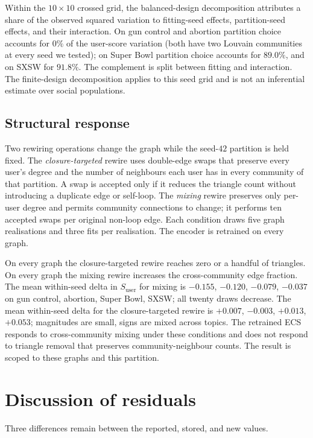 Within the $10\times 10$ crossed grid, the balanced-design decomposition attributes a share of the observed squared variation to fitting-seed effects, partition-seed effects, and their interaction. On gun control and abortion partition choice accounts for $0\%$ of the user-score variation (both have two Louvain communities at every seed we tested); on Super Bowl partition choice accounts for $89.0\%$, and on SXSW for $91.8\%$. The complement is split between fitting and interaction. The finite-design decomposition applies to this seed grid and is not an inferential estimate over social populations.

\subsection{Structural response}
\label{sec:structural}

Two rewiring operations change the graph while the seed-$42$ partition is held fixed. The \emph{closure-targeted} rewire uses double-edge swaps that preserve every user's degree and the number of neighbours each user has in every community of that partition. A swap is accepted only if it reduces the triangle count without introducing a duplicate edge or self-loop. The \emph{mixing} rewire preserves only per-user degree and permits community connections to change; it performs ten accepted swaps per original non-loop edge. Each condition draws five graph realisations and three fits per realisation. The encoder is retrained on every graph.

On every graph the closure-targeted rewire reaches zero or a handful of triangles. On every graph the mixing rewire increases the cross-community edge fraction. The mean within-seed delta in $S_{\mathrm{user}}$ for mixing is $-0.155$, $-0.120$, $-0.079$, $-0.037$ on gun control, abortion, Super Bowl, SXSW; all twenty draws decrease. The mean within-seed delta for the closure-targeted rewire is $+0.007$, $-0.003$, $+0.013$, $+0.053$; magnitudes are small, signs are mixed across topics. The retrained ECS responds to cross-community mixing under these conditions and does not respond to triangle removal that preserves community-neighbour counts. The result is scoped to these graphs and this partition.

\section{Discussion of residuals}
\label{sec:residuals}

Three differences remain between the reported, stored, and new values.

